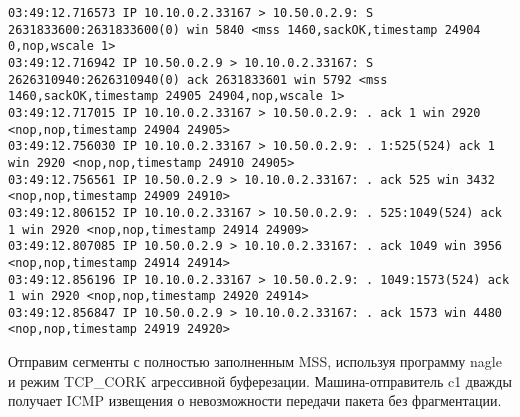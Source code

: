 \documentclass[a4paper,12pt]{article}
\begin{document}
\begin{Verbatim}
03:49:12.716573 IP 10.10.0.2.33167 > 10.50.0.2.9: S 2631833600:2631833600(0) win 5840 <mss 1460,sackOK,timestamp 24904 0,nop,wscale 1>
03:49:12.716942 IP 10.50.0.2.9 > 10.10.0.2.33167: S 2626310940:2626310940(0) ack 2631833601 win 5792 <mss 1460,sackOK,timestamp 24905 24904,nop,wscale 1>
03:49:12.717015 IP 10.10.0.2.33167 > 10.50.0.2.9: . ack 1 win 2920 <nop,nop,timestamp 24904 24905>
03:49:12.756030 IP 10.10.0.2.33167 > 10.50.0.2.9: . 1:525(524) ack 1 win 2920 <nop,nop,timestamp 24910 24905>
03:49:12.756561 IP 10.50.0.2.9 > 10.10.0.2.33167: . ack 525 win 3432 <nop,nop,timestamp 24909 24910>
03:49:12.806152 IP 10.10.0.2.33167 > 10.50.0.2.9: . 525:1049(524) ack 1 win 2920 <nop,nop,timestamp 24914 24909>
03:49:12.807085 IP 10.50.0.2.9 > 10.10.0.2.33167: . ack 1049 win 3956 <nop,nop,timestamp 24914 24914>
03:49:12.856196 IP 10.10.0.2.33167 > 10.50.0.2.9: . 1049:1573(524) ack 1 win 2920 <nop,nop,timestamp 24920 24914>
03:49:12.856847 IP 10.50.0.2.9 > 10.10.0.2.33167: . ack 1573 win 4480 <nop,nop,timestamp 24919 24920>
\end{Verbatim}

Отправим сегменты с полностью заполненным MSS, используя программу nagle и режим TCP_CORK агрессивной буферезации.
Машина-отправитель c1 дважды получает ICMP извещения о невозможности передачи пакета без фрагментации.
\end{document}

